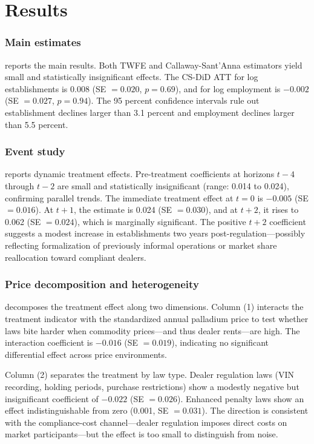 \documentclass[12pt]{article}
\begin{document}
\section{Results}\label{sec:results}

\subsubsection*{Main estimates}  reports the main results. Both TWFE and Callaway-Sant'Anna estimators yield small and statistically insignificant effects. The CS-DiD ATT for log establishments is 0.008 (SE $= 0.020$, $p = 0.69$), and for log employment is $-0.002$ (SE $= 0.027$, $p = 0.94$). The 95 percent confidence intervals rule out establishment declines larger than 3.1 percent and employment declines larger than 5.5 percent.

\subsubsection*{Event study}  reports dynamic treatment effects. Pre-treatment coefficients at horizons $t-4$ through $t-2$ are small and statistically insignificant (range: 0.014 to 0.024), confirming parallel trends. The immediate treatment effect at $t = 0$ is $-0.005$ (SE $= 0.016$). At $t+1$, the estimate is 0.024 (SE $= 0.030$), and at $t+2$, it rises to 0.062 (SE $= 0.024$), which is marginally significant. The positive $t+2$ coefficient suggests a modest increase in establishments two years post-regulation---possibly reflecting formalization of previously informal operations or market share reallocation toward compliant dealers.

\subsubsection*{Price decomposition and heterogeneity}  decomposes the treatment effect along two dimensions. Column (1) interacts the treatment indicator with the standardized annual palladium price to test whether laws bite harder when commodity prices---and thus dealer rents---are high. The interaction coefficient is $-0.016$ (SE $= 0.019$), indicating no significant differential effect across price environments.

Column (2) separates the treatment by law type. Dealer regulation laws (VIN recording, holding periods, purchase restrictions) show a modestly negative but insignificant coefficient of $-0.022$ (SE $= 0.026$). Enhanced penalty laws show an effect indistinguishable from zero (0.001, SE $= 0.031$). The direction is consistent with the compliance-cost channel---dealer regulation imposes direct costs on market participants---but the effect is too small to distinguish from noise.
\end{document}
